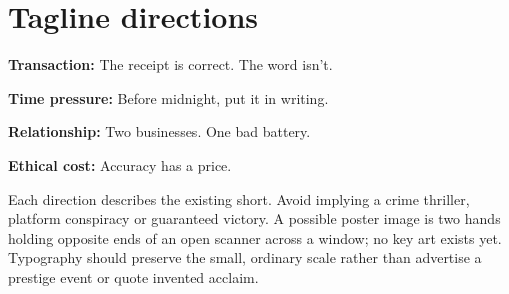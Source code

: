 \section{Tagline directions}
\textbf{Transaction:} The receipt is correct. The word isn't.

\textbf{Time pressure:} Before midnight, put it in writing.

\textbf{Relationship:} Two businesses. One bad battery.

\textbf{Ethical cost:} Accuracy has a price.

Each direction describes the existing short. Avoid implying a crime thriller, platform conspiracy or guaranteed victory. A possible poster image is two hands holding opposite ends of an open scanner across a window; no key art exists yet. Typography should preserve the small, ordinary scale rather than advertise a prestige event or quote invented acclaim.
